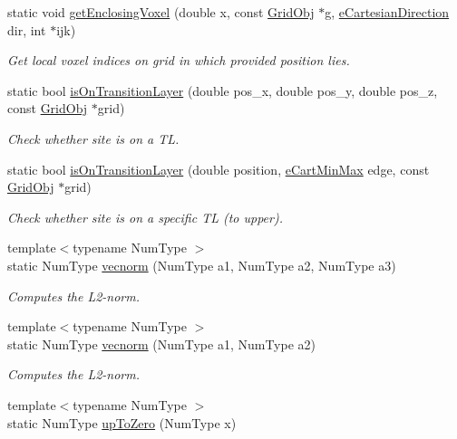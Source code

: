 \begin{DoxyCompactItemize}
static void \hyperlink{class_grid_utils_a20901145122cf56507713abe0467638c}{get\+Enclosing\+Voxel} (double x, const \hyperlink{class_grid_obj}{Grid\+Obj} $\ast$g, \hyperlink{_grid_utils_8h_afbad8e4a2f1e9903755b1bd2fe8273cf}{e\+Cartesian\+Direction} dir, int $\ast$ijk)
\begin{DoxyCompactList}\small\item\em Get local voxel indices on grid in which provided position lies. \end{DoxyCompactList}\item 
static bool \hyperlink{class_grid_utils_a78d9c31d1c15198d1455627d1fa29804}{is\+On\+Transition\+Layer} (double pos\+\_\+x, double pos\+\_\+y, double pos\+\_\+z, const \hyperlink{class_grid_obj}{Grid\+Obj} $\ast$grid)
\begin{DoxyCompactList}\small\item\em Check whether site is on a TL. \end{DoxyCompactList}\item 
static bool \hyperlink{class_grid_utils_ae99e3fa97dcb3be1f6b88a55f232c2cd}{is\+On\+Transition\+Layer} (double position, \hyperlink{_grid_utils_8h_a0cc91691e907a6a03b129d18a62fe33d}{e\+Cart\+Min\+Max} edge, const \hyperlink{class_grid_obj}{Grid\+Obj} $\ast$grid)
\begin{DoxyCompactList}\small\item\em Check whether site is on a specific TL (to upper). \end{DoxyCompactList}\item 
{\footnotesize template$<$typename Num\+Type $>$ }\\static Num\+Type \hyperlink{class_grid_utils_a78aa4876d7066bce253c52457e7b901d}{vecnorm} (Num\+Type a1, Num\+Type a2, Num\+Type a3)
\begin{DoxyCompactList}\small\item\em Computes the L2-\/norm. \end{DoxyCompactList}\item 
{\footnotesize template$<$typename Num\+Type $>$ }\\static Num\+Type \hyperlink{class_grid_utils_a7a169fc043a585f20936b314def45fe7}{vecnorm} (Num\+Type a1, Num\+Type a2)
\begin{DoxyCompactList}\small\item\em Computes the L2-\/norm. \end{DoxyCompactList}\item 
{\footnotesize template$<$typename Num\+Type $>$ }\\static Num\+Type \hyperlink{class_grid_utils_a5a3e26a94e62833f0a9e5a4bda066dac}{up\+To\+Zero} (Num\+Type x)

\end{DoxyCompactItemize}
